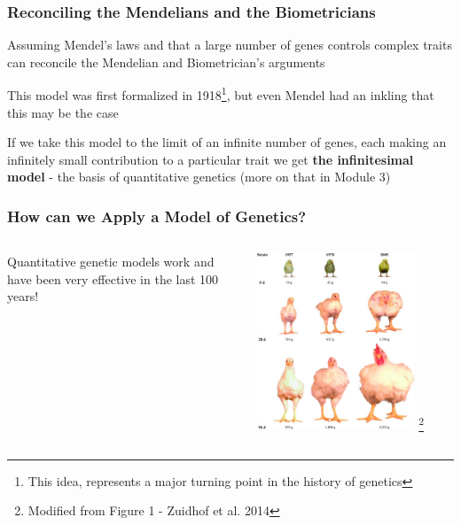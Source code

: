 \documentclass{beamer}
\begin{document}
\begin{frame}
	\frametitle{Reconciling the Mendelians and the Biometricians}

Assuming Mendel's laws and that a large number of genes controls complex traits can reconcile the Mendelian and Biometrician's arguments \\

\bigskip

This model was first formalized in 1918\footnote[1]{This idea, represents a major turning point in the history of genetics}, but even Mendel had an inkling that this may be the case \\

\bigskip

If we take this model to the limit of an infinite number of genes, each making an infinitely small contribution to a particular trait we get \textbf{the infinitesimal model} - the basis of quantitative genetics (more on that in Module 3) 

\end{frame}

\begin{frame}
	
	\frametitle{How can we Apply a Model of Genetics?}
	
	
\begin{columns}
	\begin{column}{0.3\textwidth}	
		Quantitative genetic models work and have been very effective in the last 100 years!
	\end{column}
	\begin{column}{0.7\textwidth}
	\centering
	\includegraphics[keepaspectratio, width  =0.8\textwidth]{img/zuidhof_2014} \footnote {Modified from Figure 1 - Zuidhof et al. 2014}
\end{column}
\end{columns}
	
\end{frame}
\end{document}
